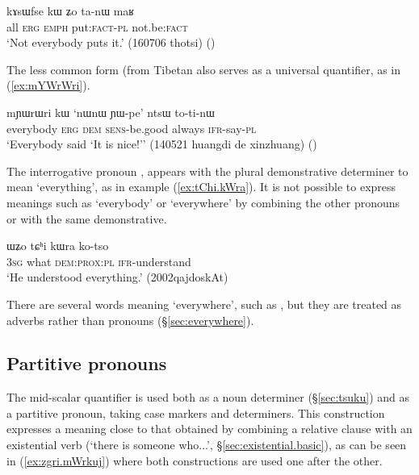 \begin{exe}
\ex \label{ex:kAsWfse.kW}
\gll kɤsɯfse kɯ ʑo ta-nɯ maʁ \\
all \textsc{erg} \textsc{emph} put:\textsc{fact}-\textsc{pl} not.be:\textsc{fact} \\
\glt `Not everybody puts it.' (160706 thotsi)
()
\end{exe}

The less common form  (from Tibetan  also serves as a universal quantifier, as in (\ref{ex:mYWrWri}).

\begin{exe}
\ex \label{ex:mYWrWri}
\gll mɲɯrɯri kɯ `nɯnɯ ɲɯ-pe' ntsɯ to-ti-nɯ \\
everybody \textsc{erg} \textsc{dem} \textsc{sens}-be.good always \textsc{ifr}-say-\textsc{pl} \\
\glt `Everybody said `It is nice!'' (140521 huangdi de xinzhuang)
()
\end{exe}

The interrogative pronoun , appears with the plural demonstrative determiner  to mean `everything', as in example (\ref{ex:tChi.kWra}). It is not possible to express meanings such as `everybody' or `everywhere'  by combining the other pronouns  or  with the same demonstrative.

\begin{exe}
\ex \label{ex:tChi.kWra}
\gll ɯʑo tɕʰi kɯra ko-tso \\
\textsc{3sg} what \textsc{dem}:\textsc{prox:pl} \textsc{ifr}-understand \\
\glt `He understood everything.' (2002qajdoskAt)
\end{exe}

There are several words meaning `everywhere', such as , but they are treated as adverbs rather than pronouns (§\ref{sec:everywhere}).

\subsection{Partitive pronouns} \label{sec:partitive.pronouns}
The mid-scalar quantifier  is used both as a noun determiner (§\ref{sec:tsuku}) and as a partitive pronoun, taking case markers and determiners. This construction expresses a meaning close to that obtained by combining a relative clause with an existential verb (`there is someone who...', §\ref{sec:existential.basic}), as can be seen in (\ref{ex:zgri.mWrkuj}) where both constructions are used one after the other. 


